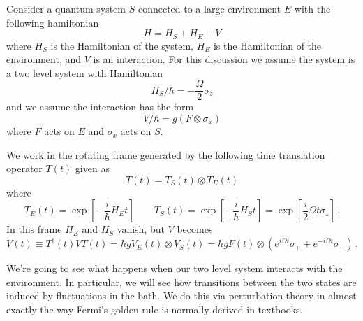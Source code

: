 
Consider a quantum system $S$ connected to a large environment $E$ with the following hamiltonian
\begin{equation}
H = H_S + H_E + V
\end{equation}
where $H_S$ is the Hamiltonian of the system, $H_E$ is the Hamiltonian of the environment, and $V$ is an interaction.
For this discussion we assume the system is a two level system with Hamiltonian
\begin{equation}
H_S / \hbar = - \frac{\Omega}{2} \sigma_z
\end{equation}
and we assume the interaction has the form
\begin{equation}
V / \hbar = g \left( F \otimes \sigma_x \right)
\end{equation}
where $F$ acts on $E$ and $\sigma_x$ acts on $S$.

We work in the rotating frame generated by the following time translation operator $T(t)$ given as
\begin{equation}
T(t) = T_S(t) \otimes T_E(t)
\end{equation}
where
\begin{equation}
T_E(t) = \exp \left[ - \frac{i}{\hbar} H_E t \right]
\qquad
T_S(t)
= \exp \left[ - \frac{i}{\hbar} H_S t \right]
= \exp \left[ \frac{i}{2} \Omega t \sigma_z \right] \, .
\end{equation}
In this frame $H_E$ and $H_S$ vanish, but $V$ becomes
\begin{equation}
\tilde{V}(t)
\equiv T^\dagger(t) V T(t)
= \hbar g \tilde{V}_E(t) \otimes \tilde{V}_S(t)
= \hbar g
F(t)
\otimes \left( e^{i \Omega t}\sigma_+ + e^{-i \Omega t} \sigma_- \right) \, .
\end{equation}

We're going to see what happens when our two level system interacts with the environment.
In particular, we will see how transitions between the two states are induced by fluctuations in the bath.
We do this via perturbation theory in almost exactly the way Fermi's golden rule is normally derived in textbooks.


